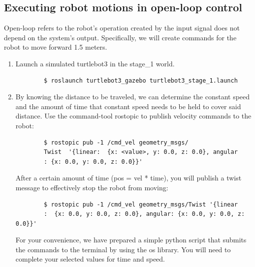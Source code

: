\documentclass[12pt]{article}
\begin{document}
\subsection{Executing robot motions in open-loop control}

Open-loop refers to the robot’s operation created by the input signal does not depend on the system’s output. Specifically, we will create commands for the robot to move forward 1.5 meters.
\begin{enumerate}
    \item Launch a simulated turtlebot3 in the stage\_1 world.
    \begin{verbatim}
        $ roslaunch turtlebot3_gazebo turtlebot3_stage_1.launch
    \end{verbatim}
    \item By knowing the distance to be traveled, we can determine the constant speed and the amount of time that constant speed needs to be held to cover said distance. Use the command-tool rostopic to publish velocity commands to the robot:
    \begin{verbatim}
        $ rostopic pub -1 /cmd_vel geometry_msgs/
        Twist  '{linear:  {x: <value>, y: 0.0, z: 0.0}, angular
        : {x: 0.0, y: 0.0, z: 0.0}}'
    \end{verbatim}
    After a certain amount of time (pos = vel * time), you will publish a twist message to effectively stop the robot from moving:

    \begin{verbatim}
        $ rostopic pub -1 /cmd_vel geometry_msgs/Twist '{linear
        :  {x: 0.0, y: 0.0, z: 0.0}, angular: {x: 0.0, y: 0.0, z: 0.0}}'
    \end{verbatim}
    
    For your convenience, we have prepared a simple python script that submits the commands to the terminal by using the os library. You will need to complete your selected values for time and speed.
    
    
    
\end{enumerate}
\end{document}

